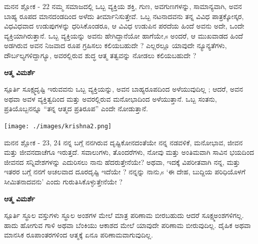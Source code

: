 \begin{mananam}{\mananamfont ಮನನ ಶ್ಲೋಕ - \textenglish{22}}
\footnotesize \mananamtext ನಮ್ಮ ಸಮಾಜದಲ್ಲಿ ಒಬ್ಬ ವ್ಯಕ್ತಿಯ ಶಕ್ತಿ, ಗುಣ, ಅವಗುಣಗಳನ್ನು, ಸಾಮಾನ್ಯವಾಗಿ, ಅವನ ಬಾಹ್ಯ ರೂಪದ ಮಾನದಂಡದಿಂದ ಅಳೆದು ತೀರ್ಮಾನಿಸುತ್ತೇವೆ. ಒಬ್ಬ ನಟನಾದವನು ತನ್ನ ವಿವಿಧ ಪಾತ್ರಕ್ಕೋಸ್ಕರ, ವಿಧವಿಧವಾದ ಉಡುಪುಗಳನ್ನು ಧರಿಸಿಕೊಂಡರೂ, ಆ ವಿವಿಧ ಉಡುಪಿನ ಪರದೆಯ ಹಿಂದೆ ಅವನು ಅದೇ, ಒಂದೇ ವ್ಯಕ್ತಿಯಾಗಿರುತ್ತಾನೆ. ಒಬ್ಬ ವ್ಯಕ್ತಿಯನ್ನು ಅವನು ಹೇಗಿದ್ದಾನೆಯೋ ಹಾಗೆಯೇ,s ಅಂದರೆ,  ಆ ಮುಖವಾಡದ ಹಿಂದೆ ಅಡಗಿರುವ ಅವನ ನಿಜವಾದ ರೂಪ ಗ್ರಹಿಸಲು ಕಲಿಯಬಹುದೇ ? ಎಲ್ಲರಲ್ಲೂ ಯಾವುದೇ ನ್ಯೂನ್ಯತೆಗಳು, ದೌರ್ಬಲ್ಯಗಳಿದ್ದಾಗ್ಯೂ, ಅವರಲ್ಲಿರುವ ಶುದ್ಧ ಆತ್ಮ ತತ್ವವನ್ನು ನೋಡಲು ಕಲಿಯಬಹುದೇ ?
\end{mananam}
\WritingHand\enspace\textbf{ಆತ್ಮ ವಿಮರ್ಶೆ}
\begin{inspiration}{\mananamfont ಸ್ಪೂರ್ತಿ}
\footnotesize \mananamtext ಸೂಕ್ಷ್ಮದೃಷ್ಟಿ ಇರುವವನು ಒಬ್ಬ ವ್ಯಕ್ತಿಯನ್ನು, ಅವನ ಬಾಹ್ಯರೂಪದಿಂದ ಅಳೆಯುವುದಿಲ್ಲ ;  ಆದರೆ, ಅವನ ಅಥವಾ ಅವಳ ವ್ಯಕ್ತಿತ್ವದಿಂದ ಮತ್ತು  ಅವರಲ್ಲಿರುವ ಮನೋಭಾದಿಂದ ಅಳೆಯುತ್ತಾನೆ. ಒಬ್ಬ ಸಂತನು, ಪ್ರತಿಯೊಬ್ಬನನ್ನೂ “ತನ್ನ ಆತ್ಮದ ಪ್ರತಿರೂಪ” ಎಂದೇ ನೋಡುತ್ತಾನೆ.
\end{inspiration}
\newpage

\thispagestyle{empty}
\begin{center}
\texttt{[image: ./images/krishna2.png]}
\end{center}
\restoregeometry %
\newpage

\begin{mananam}{\mananamfont ಮನನ ಶ್ಲೋಕ - \textenglish{23, 24}}
\footnotesize \mananamtext ನನ್ನ ಬಗ್ಗೆ ನನಗಿರುವ ದೃಷ್ಟಿಕೋನದಂತೆಯೇ ನನ್ನ ನಡವಳಿಕೆ, ಮನೋಭಾವ, ಜೀವನ ಮತ್ತು ಜೀವನದಾಚೆಗೂ  ಇರುತ್ತದೆ. ಸವಾಲುಗಳು, ತೊಂದರೆಗಳು, ನೋವು ಮತ್ತು ಅಂತಿಮವಾಗಿ ಸಾವಿನ ಭಯದಿಂದ ಜೀವನದ ಸನ್ನಿವೇಶಗಳನ್ನು ಎದುರಿಸಲು ನಾನು ಹೆದರುತ್ತೇನೆಯೇ? ಅಥವಾ, ಇದಕ್ಕೆ ವಿಪರೀತವಾಗಿ ನನ್ನ, ಮತ್ತು ಇತರರ ಬಗ್ಗೆ ನನಗೆ ಅಚಲವಾದ ದೂರದೃಷ್ಟಿ ಇದೆಯೇ ?  ನನ್ನನ್ನು ನಾನು,s ‘ಈ ದೇಹ, ಬುದ್ದಿಯ ಪರಿಧಿಯೊಳಗೆ ಸೀಮಿತನಾದವನು’ ಎಂದು ಗುರುತಿಸಿಕೊಳ್ಳುತ್ತೇನೆಯೇ ? 
\end{mananam}
\WritingHand\enspace\textbf{ಆತ್ಮ ವಿಮರ್ಶೆ}
\begin{inspiration}{\mananamfont ಸ್ಪೂರ್ತಿ}
\footnotesize \mananamtext ಸ್ಥೂಲ ವಸ್ತುಗಳು ಸ್ಥೂಲ ಅಂಶಗಳ ಮೇಲೆ ಮಾತ್ರ ಪರಿಣಾಮ ಬೀರಬಹುದು ಆದರೆ ಸೂಕ್ಷ್ಮಅಂಶಗಳಿಗಲ್ಲ. ಹಾದು ಹೋಗುವ ಗಾಳಿ ಅಥವಾ ಬೆಂಕಿಯು ಆಕಾಶದ ಮೇಲೆ ಯಾವುದೇ ಪರಿಣಾಮ ಬೀರುವುದಿಲ್ಲ. ದೈಹಿಕ ಅಥವಾ ಮಾನಸಿಕ ರೂಪಾಂತರಗಳಿಂದ ಆತ್ಮಕ್ಕೆ ಏನೂ ಪರಿಣಾಮವಾಗುವುದಿಲ್ಲ.
\end{inspiration}
\newpage

